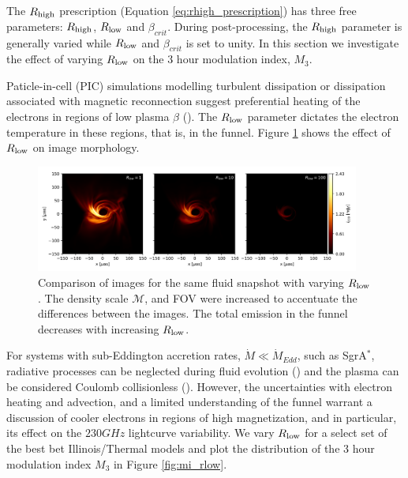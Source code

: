 The $R_\mathrm{high}$ prescription (Equation \ref{eq:rhigh_prescription}) has three free parameters: $R_\mathrm{high}$, $R_\mathrm{low}$ and $\beta_{crit}$. During post-processing, the $R_\mathrm{high}$ parameter is generally varied while $R_\mathrm{low}$ and $\beta_{crit}$ is set to unity. In this section we investigate the effect of varying $R_\mathrm{low}$ on the 3 hour modulation index, $M_{3}$.

Paticle-in-cell (PIC) simulations modelling turbulent dissipation or dissipation associated with magnetic reconnection suggest preferential heating of the electrons in regions of low plasma $\beta$ (\citealt{2010MNRAS.409L.104H, Rowan_2017, 10.1093/mnras/stx2530, Rowan_2019, Kawazura771, PhysRevX.10.041050, kawazura2021energy}). The $R_\mathrm{low}$ parameter dictates the electron temperature in these regions, that is, in the funnel. Figure \ref{fig:rlow_comparison} shows the effect of $R_\mathrm{low}$ on image morphology.

\begin{figure}
\centering
\includegraphics[width=0.95\textwidth]{figures/rlow_comparison_rhigh160.png}
\caption{Comparison of images for the same fluid snapshot with varying $R_\mathrm{low}$. The density scale $\mathcal{M}$, and FOV were increased to accentuate the differences between the images. The total emission in the funnel decreases with increasing $R_\mathrm{low}$.}
\label{fig:rlow_comparison}
\end{figure}

For systems with sub-Eddington accretion rates, $\Dot{M}\ll\Dot{M}_{Edd}$, such as SgrA$^{*}$, radiative processes can be neglected during fluid evolution (\citealt{2012MNRAS.426.1928D, 10.1093/mnras/stw3116, Ryan_2017}) and the plasma can be considered Coulomb collisionless (\citealt{Mahadevan_1997, 10.1093/mnras/stw3116, Ryan_2017}). However, the uncertainties with electron heating and advection, and a limited understanding of the funnel warrant a discussion of cooler electrons in regions of high magnetization, and in particular, its effect on the $230GHz$ lightcurve variability. We vary $R_\mathrm{low}$ for a select set of the best bet Illinois/Thermal models and plot the distribution of the 3 hour modulation index $M_{3}$ in Figure \ref{fig:mi_rlow}.

